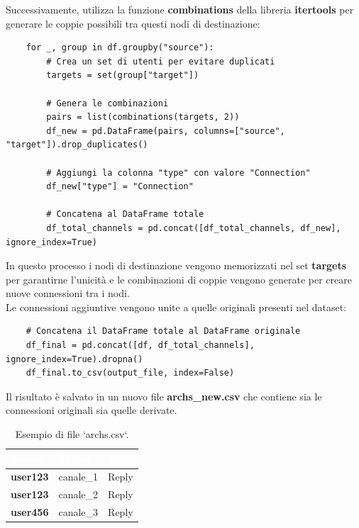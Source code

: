 \documentclass[12pt]{article}
\begin{document}
	Successivamente, utilizza la funzione \textbf{combinations} della libreria \textbf{itertools} per generare le coppie possibili tra questi nodi di destinazione:
	\begin{lstlisting}
	for _, group in df.groupby("source"):
		# Crea un set di utenti per evitare duplicati
		targets = set(group["target"])
		
		# Genera le combinazioni
		pairs = list(combinations(targets, 2))
		df_new = pd.DataFrame(pairs, columns=["source", "target"]).drop_duplicates()
		
		# Aggiungi la colonna "type" con valore "Connection"
		df_new["type"] = "Connection"
		
		# Concatena al DataFrame totale
		df_total_channels = pd.concat([df_total_channels, df_new], ignore_index=True)
	\end{lstlisting}
	In questo processo i nodi di destinazione vengono memorizzati nel set \textbf{targets} per garantirne l'unicità e le combinazioni di coppie vengono generate per creare nuove connessioni tra i nodi.\\
	Le connessioni aggiuntive vengono unite a quelle originali presenti nel dataset:
	\begin{lstlisting}
	# Concatena il DataFrame totale al DataFrame originale
	df_final = pd.concat([df, df_total_channels], ignore_index=True).dropna()
	df_final.to_csv(output_file, index=False)
	\end{lstlisting}
	Il risultato è salvato in un nuovo file \textbf{archs\_new.csv} che contiene sia le connessioni originali sia quelle derivate.
	\begin{table}[H]
		\centering
		\begin{tabular}{|p{5cm}|p{4cm}|p{4cm}|}
			\hline
			\cellcolor{darkblue}\textcolor{white}{\textbf{Source}} & 
			\cellcolor{darkblue}\textcolor{white}{\textbf{Target}} & 
			\cellcolor{darkblue}\textcolor{white}{\textbf{Type}} \\
			\hline
			\textbf{user123} & canale\_1 & Reply \\
			\hline
			\textbf{user123} & canale\_2 & Reply\\
			\hline
			\textbf{user456} & canale\_3 & Reply\\
			\hline
		\end{tabular}
		\caption{Esempio di file `archs.csv`.}
		\label{tab:archs.csv}
	\end{table}
\end{document}
